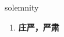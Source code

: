 
\begin{frame}
{\huge solemnity}
\begin{center}
\begin{enumerate}\Large
  \item \textbf{庄严，严肃}
\end{enumerate}
\end{center}
\end{frame}
